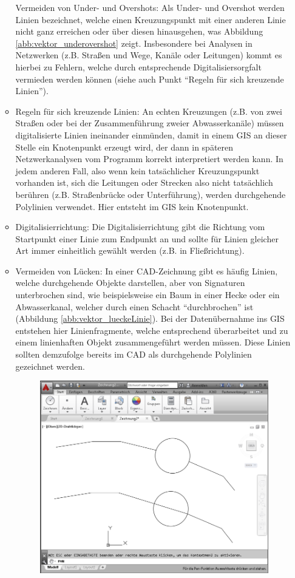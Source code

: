 \begin{itemize}
\begin{itemize}
\begin{adjustbox}{valign=T,raise=\strutheight,minipage={\linewidth}}
    \strut{}Vermeiden von Under- und Overshots: Als Under- und Overshot werden Linien bezeichnet, welche einen Kreuzungspunkt mit einer anderen Linie nicht ganz erreichen oder über diesen hinausgehen, was Abbildung \ref{abb:vektor_underovershot} zeigt. Insbesondere bei Analysen in Netzwerken (z.B. Straßen und Wege, Kanäle oder Leitungen) kommt es hierbei zu Fehlern, welche durch entsprechende Digitalisiersorgfalt vermieden werden können (siehe auch Punkt "`Regeln für sich kreuzende Linien"').
    \end{adjustbox}
		\item Regeln für sich kreuzende Linien: An echten Kreuzungen (z.B. von zwei Straßen oder bei der Zusammenführung zweier Abwasserkanäle) müssen digitalisierte Linien ineinander einmünden, damit in einem GIS an dieser Stelle ein Knotenpunkt erzeugt wird, der dann in späteren Netzwerkanalysen vom Programm korrekt interpretiert werden kann. In jedem anderen Fall, also wenn kein tatsächlicher Kreuzungspunkt vorhanden ist, sich die Leitungen oder Strecken also nicht tatsächlich berühren (z.B. Straßenbrücke oder Unterführung), werden durchgehende Polylinien verwendet. Hier entsteht im GIS kein Knotenpunkt.
		\item Digitalisierrichtung: Die Digitalisierrichtung gibt die Richtung vom Startpunkt einer Linie zum Endpunkt an und sollte für Linien gleicher Art immer einheitlich gewählt werden (z.B. in Fließrichtung).
		\item Vermeiden von Lücken: In einer CAD-Zeichnung gibt es häufig Linien, welche durchgehende Objekte darstellen, aber von Signaturen unterbrochen sind, wie beispielsweise ein Baum in einer Hecke oder ein Abwasserkanal, welcher durch einen Schacht "`durchbrochen"' ist (Abbildung \ref{abb:vektor_lueckeLinie}). Bei der Datenübernahme ins GIS entstehen hier Linienfragmente, welche entsprechend überarbeitet und zu einem linienhaften Objekt zusammengeführt werden müssen. Diese Linien sollten demzufolge bereits im CAD als durchgehende Polylinien gezeichnet werden.
		\begin{figure}[h!tb]
			\centering
			\includegraphics[width=0.65\linewidth]{bilder/vektor_lueckeLinie}

\end{figure}
\end{itemize}
\end{itemize}
